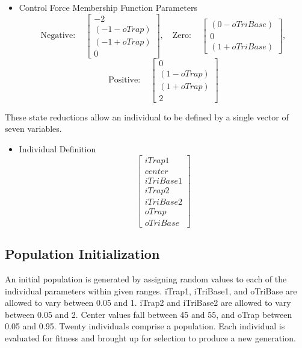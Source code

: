 \begin{itemize}
\item Control Force Membership Function Parameters \begin{displaymath} \mathrm{Negative:}\quad
    \begin{bmatrix} -2\\ (-1-oTrap)\\ (-1+oTrap)\\0 \end{bmatrix}, \quad \mathrm{Zero:}\quad
    \begin{bmatrix} (0-oTriBase)\\0\\ (1+oTriBase) \end{bmatrix}, \end{displaymath}
        \begin{displaymath} \mathrm{Positive:}\quad \begin{bmatrix} 0\\ (1-oTrap)\\
    (1+oTrap)\\2 \end{bmatrix} \end{displaymath} \end{itemize}
 
These state reductions allow an individual to be defined by a single vector of seven variables.
\begin{itemize} \item Individual Definition \begin{displaymath} \begin{bmatrix} iTrap1\\ center\\ iTriBase1\\
iTrap2 \\iTriBase2 \\oTrap \\oTriBase \end{bmatrix} \end{displaymath} \end{itemize}
 
\subsection{Population Initialization} An initial population is generated by assigning random values to each
of the individual parameters within given ranges. iTrap1, iTriBase1, and oTriBase are allowed to vary between
0.05 and 1. iTrap2 and iTriBase2 are allowed to vary between 0.05 and 2. Center values fall between 45 and 55,
and oTrap between 0.05 and 0.95. Twenty individuals comprise a population. Each individual is evaluated for
fitness and brought up for selection to produce a new generation.

